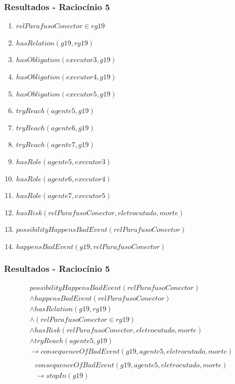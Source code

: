 \documentclass{beamer}
\begin{document}
\begin{frame}
	\frametitle{Resultados - Raciocínio 5}
	\begin{enumerate}
		\item $relParafusoConector \in rg19$	
		\item $hasRelation(g19,rg19)$		
		\item $hasObligation(executor3,g19)$
		\item $hasObligation(executor4,g19)$
		\item $hasObligation(executor5,g19)$		
		\item $tryReach(agente5,g19)$
		\item $tryReach(agente6,g19)$
		\item $tryReach(agente7,g19)$									
		\item $hasRole(agente5,executor3)$
		\item $hasRole(agente6,executor4)$
		\item $hasRole(agente7,executor5)$
		\item $hasRisk(relParafusoConector,eletrocutado,morte)$
		\item $possibilityHappensBadEvent(relParafusoConector)$
		\item $happensBadEvent(g19,relParafusoConector)$	
	\end{enumerate}
\end{frame}

\begin{frame}
	\frametitle{Resultados - Raciocínio 5}
	\begin{eqnarray}\nonumber
	    possibilityHappensBadEvent(relParafusoConector) \nonumber \\
	    \wedge happensBadEvent(relParafusoConector) \nonumber \\ 
	    \wedge hasRelation(g19,rg19)  \nonumber \\  
	    \wedge (relParafusoConector \in rg19) \nonumber \\ 
	    \wedge hasRisk(relParafusoConector,eletrocutado,morte) \nonumber \\  
	    \wedge tryReach(agente5,g19) \nonumber \\ 
	    \to consequenceOfBadEvent(g19,agente5,eletrocutado,morte) \\ \nonumber
	\end{eqnarray}
	\begin{eqnarray}
		consequenceOfBadEvent(g19,agente5,eletrocutado,morte) \nonumber \\ 
		\to stopIn(g19)
	\end{eqnarray}
\end{frame}
\end{document}
